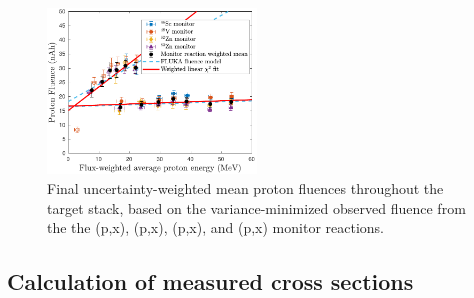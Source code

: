 \begin{figure}
 \centering
 \includegraphics[width=0.495\textwidth]{./figures/fluence_plot.pdf}
 \caption{Final uncertainty-weighted mean proton fluences throughout the target stack, based on the variance-minimized observed fluence from the the  (p,x), (p,x), (p,x), and (p,x) monitor reactions.} 
 \label{fig:fe_fluence_plot}
\end{figure}






\subsection{\label{sec:calcs_sec_fe}Calculation of measured cross sections}


